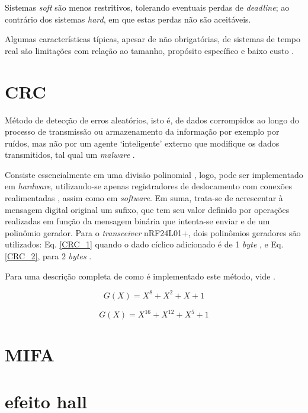 Sistemas \textit{soft} são menos restritivos, tolerando eventuais perdas de \textit{deadline}; 
ao contrário dos sistemas \textit{hard}, em que estas perdas não são aceitáveis.  

Algumas características típicas, apesar de não obrigatórias, de sistemas de tempo real são limitações com relação ao tamanho, propósito específico e 
baixo custo \cite{silberschatz}.

\section{CRC}
Método de detecção de erros aleatórios, isto é, de dados corrompidos ao longo do processo de transmissão ou armazenamento da informação por exemplo 
por ruídos, mas não por um agente \textquoteleft inteligente\textquoteright{} externo que modifique os dados transmitidos, tal qual um 
\textit{malware} \cite{stigge}.

Consiste essencialmente em uma divisão polinomial \cite{stigge}, logo, pode ser implementado em \textit{hardware}, utilizando-se apenas registradores 
de deslocamento com conexões realimentadas \cite{peterson}, assim como em \textit{software}. 
Em suma, trata-se de acrescentar à mensagem digital original um sufixo, que tem seu valor definido por operações realizadas em função da mensagem 
binária que intenta-se enviar e de um polinômio gerador.
Para o \textit{transceiver} nRF24L01+, dois polinômios geradores são utilizados: Eq. \ref{CRC_1} quando o dado cíclico adicionado é de 1 
\textit{byte} , e Eq. \ref{CRC_2}, para 2 \textit{bytes} \cite{nRF}.

Para uma descrição completa de como é implementado este método, vide \cite{stigge,peterson}.

\begin{equation}
\label{CRC_1}
G(X) = X^8 + X^2 + X + 1 
\end{equation}

\begin{equation}
\label{CRC_2}
G(X) = X^{16} + X^{12} + X^5 + 1 
\end{equation}

\section{MIFA} %

\section{efeito hall} %

